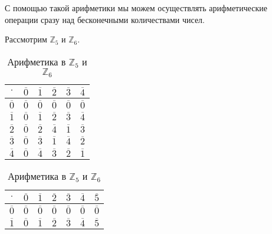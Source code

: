 \documentclass[russian]{lecture-notes}
\newcommand{\klas}[1]{\overline{#1}}
\begin{document}
\begin{note}
	С помощью такой арифметики мы можем осуществлять арифметические операции сразу над бесконечными количествами чисел.
\end{note}

\begin{example}
	Рассмотрим $\mathbb{Z}_5$ и $\mathbb{Z}_6$.
	\begin{table}[H]
		\caption{Арифметика в $\mathbb{Z}_5$ и $\mathbb{Z}_6$}
		\centering
		\label{tab:arif}
		\begin{subtable}[H]{0.49\linewidth}
			\centering
			\label{tab:arif1}
			\begin{tabular}{|c|c|c|c|c|c|}
				\hline
				$\cdot$ & $\klas{0}$ & $\klas{1}$ & $\klas{2}$ & $\klas{3}$ & $\klas{4}$\\ \hline
				
				$\klas{0}$  & $\klas{0}$ & $\klas{0}$ & $\klas{0}$ & $\klas{0}$ & $\klas{0}$\\ \hline
				
				$\klas{1}$ & $\klas{0}$ & $\klas{1}$ & $\klas{2}$ & $\klas{3}$ & $\klas{4}$\\ \hline
				
				$\klas{2}$ & $\klas{0}$ & $\klas{2}$ & $\klas{4}$ & $\klas{1}$ & $\klas{3}$\\ \hline
				
				$\klas{3}$ & $\klas{0}$ & $\klas{3}$ & $\klas{1}$ & $\klas{4}$ & $\klas{2}$\\ \hline
				
				$\klas{4}$ & $\klas{0}$ & $\klas{4}$ & $\klas{3}$ & $\klas{2}$ & $\klas{1}$\\ \hline
			\end{tabular}
		\end{subtable}
		\hfill
		\begin{subtable}[H]{0.49\linewidth}
			\centering
			\label{tab:arif2}
			\begin{tabular}{|c|c|c|c|c|c|c|}
				\hline
				\centering
				\label{tab:arif2}
				$\cdot$ & $\klas{0}$ & $\klas{1}$ & $\klas{2}$ & $\klas{3}$ & $\klas{4}$ & $\klas{5}$\\ \hline
				
				$\klas{0}$  & $\klas{0}$ & $\klas{0}$ & $\klas{0}$ & $\klas{0}$ & $\klas{0}$ & $\klas{0}$\\ \hline
				
				$\klas{1}$ & $\klas{0}$ & $\klas{1}$ & $\klas{2}$ & $\klas{3}$ & $\klas{4}$ & $\klas{5}$\\ \hline
				

\end{tabular}
\end{subtable}
\end{table}
\end{example}
\end{document}
